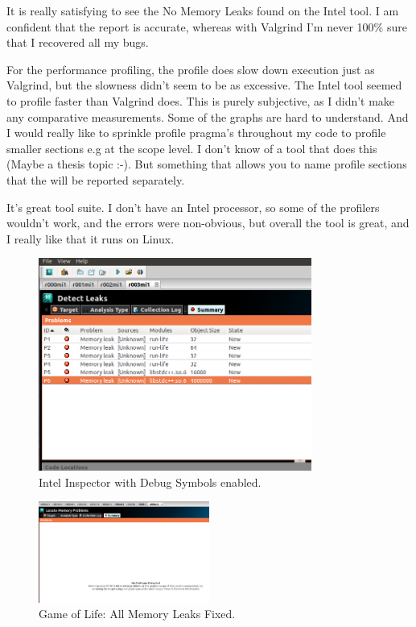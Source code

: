 \documentclass[journal,10pt,onecolumn]{IEEEtran}
\begin{document}
It is really satisfying to see the No Memory Leaks found on the Intel tool. I am 
confident that the report is accurate, whereas with Valgrind I'm never 100\% sure that I recovered all my bugs.

For the performance profiling, the profile does slow down execution just as 
Valgrind, but the slowness didn't seem to be as excessive.  The Intel tool 
seemed to profile faster than Valgrind does.  This is purely subjective, as 
I didn't make any comparative measurements.  Some of the graphs are hard to 
understand. And I would really like to sprinkle profile pragma's throughout my 
code to profile smaller sections e.g at the scope level. I don't know of a tool 
that does this (Maybe a thesis topic :-).  But something that allows you to name 
profile sections that the will be reported separately.  

It's great tool suite. I don't have an Intel processor, so some of the profilers 
wouldn't work, and the errors were non-obvious, but overall the tool is great, and 
I really like that it runs on Linux.

\begin{figure}[!t]
\begin{center}
\includegraphics[width=0.8\textwidth]{figures/fileMep7k0_Memory_Analysis.png}
\caption{Intel Inspector with Debug Symbols enabled.}
\label{fig:intentional_memory_leak}
\end{center}
\end{figure}

\begin{figure}[!t]
\begin{center}
\includegraphics[width=0.5\textwidth]{figures/ChangeSet14_Memory.png}
\caption{Game of Life: All Memory Leaks Fixed.}
\label{fig:inspector_clean_memory}
\end{center}
\end{figure}
\end{document}
